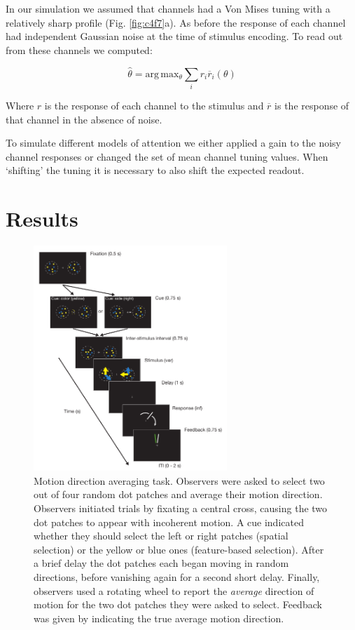 In our simulation we assumed that channels had a Von Mises tuning with a relatively sharp profile (Fig. \ref{fig:c4f7}a). As before the response of each channel had independent Gaussian noise at the time of stimulus encoding. To read out from these channels we computed:

\begin{equation}
    \hat{\theta} = \mathrm{arg}\,\mathrm{max}_{\theta} \sum_{i} r_i \overline{r}_i (\theta)
\end{equation}

Where $r$ is the response of each channel to the stimulus and $\overline{r}$ is the response of that channel in the absence of noise. 

To simulate different models of attention we either applied a gain to the noisy channel responses or changed the set of mean channel tuning values. When `shifting' the tuning it is necessary to also shift the expected readout. 

\section{Results}

\begin{figure}
\centering
\includegraphics[keepaspectratio,width=0.65\textwidth]{figs_c4/f1_task.pdf}
\caption[Averaging task]{Motion direction averaging task. Observers were asked to select two out of four random dot patches and average their motion direction. Observers initiated trials by fixating a central cross, causing the two dot patches to appear with incoherent motion. A cue indicated whether they should select the left or right patches (spatial selection) or the yellow or blue ones (feature-based selection). After a brief delay the dot patches each began moving in random directions, before vanishing again for a second short delay. Finally, observers used a rotating wheel to report the \textit{average} direction of motion for the two dot patches they were asked to select. Feedback was given by indicating the true average motion direction.}
\label{fig:c4f1}
\end{figure}

